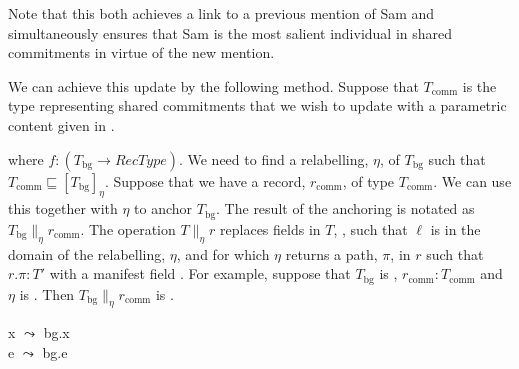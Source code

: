 Note that this both achieves a link to a previous mention of Sam and
simultaneously ensures that Sam is the most salient individual in
shared commitments in virtue of the new mention.


We can achieve this update by the following method.  Suppose that $T_{\mathrm{comm}}$ is the
type representing shared commitments that we wish to update with a
parametric content given in \nexteg{}.
\begin{ex}
\end{ex}
where $f:(T_{\mathrm{bg}}\rightarrow\textit{RecType})$.  %
We
need to find a relabelling, $\eta$, of 
$T_{\mathrm{bg}}$ such that $T_{\mathrm{comm}}\sqsubseteq[T_{\mathrm{bg}}]_\eta$.
\label{pg:anchoring}Suppose that we have a record, $r_{\mathrm{comm}}$, of type
$T_{\mathrm{comm}}$.  We can use this together with $\eta$ to anchor
$T_{\mathrm{bg}}$.  The result of the anchoring is notated as 
$T_{\mathrm{bg}}\parallel_\eta r_{\mathrm{comm}}$. The operation
$T \parallel_\eta r$ %
replaces fields in $T$, , such
that $\ell$ is in the
domain of the relabelling, $\eta$, and for which $\eta$ returns a
path, $\pi$,
in $r$ such that $r.\pi:T'$ with a manifest
field . For example,
suppose that $T_{\mathrm{bg}}$ is ,
$r_{\mathrm{comm}}:T_{\mathrm{comm}}$ and $\eta$ is . Then
\mbox{$T_{\mathrm{bg}}\parallel_\eta r_{\mathrm{comm}}$} is .
\begin{ex} 
\begin{subex} 
 
\item {} 
 
\item x $\leadsto$ bg.x\\
      e $\leadsto$ bg.e

\item {}
 
\end{subex} 
   
\end{ex} 
  

